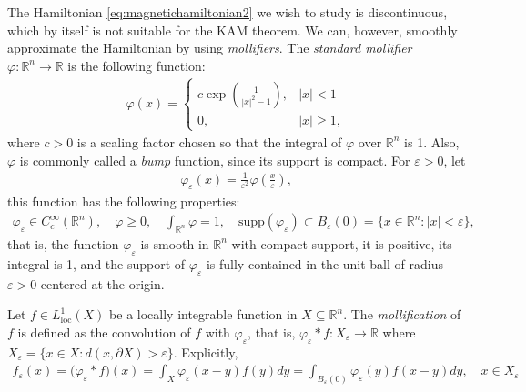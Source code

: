 The Hamiltonian \eqref{eq:magnetichamiltonian2} we wish to study is discontinuous, which by itself is not suitable for the KAM theorem. We can, however, smoothly approximate the Hamiltonian by using \textit{mollifiers}. The \textit{standard mollifier} $\varphi:\mathbb R^n\to\mathbb R$ is the following function:
\begin{align*}
\varphi(x) = \left\{\begin{array}{ll}
c\exp\left(\frac{1}{|x|^2-1}\right), & |x| <1\\
0, & |x|\ge 1,
\end{array}
\right.
\end{align*}
where $c>0$ is a scaling factor chosen so that the integral of $\varphi$ over $\mathbb R^n$ is 1. Also, $\varphi$ is commonly called a \textit{bump} function, since its support is compact. For $\varepsilon>0$, let
\begin{align*}
\varphi_\varepsilon(x) = \frac{1}{\varepsilon^2}\varphi\left(\frac{x}{\varepsilon}\right),
\end{align*} 
this function has the following properties:
\begin{align*}
\varphi_\varepsilon\in C_c^\infty(\mathbb R^n),\quad
\varphi\ge 0,\quad
\int_{\mathbb R^n}\varphi =1,\quad
\text{supp}(\varphi_\varepsilon)\subset B_\varepsilon(0)=\{x\in\mathbb R^n:|x|<\varepsilon\},
\end{align*}
that is, the function $\varphi_\varepsilon$ is smooth in $\mathbb R^n$ with compact support, it is positive, its integral is 1, and the support of $\varphi_\varepsilon$ is fully contained in the unit ball of radius $\varepsilon>0$ centered at the origin.
  
Let $f\in L_{\text{loc}}^1(X)$ be a locally integrable function in $X \subseteq\mathbb R^n$. The \textit{mollification} of $f$ is defined as the convolution of $f$ with $\varphi_\varepsilon$, that is, $\varphi_\varepsilon*f:X_\varepsilon\to\mathbb R$ where $X_\varepsilon=\{x\in X: d(x,\partial X)>\varepsilon\}$. Explicitly,
\begin{align*}
f_\varepsilon(x) = \big(\varphi_\varepsilon * f\big)(x) = \int_X\varphi_\varepsilon(x-y)f(y)dy = \int_{B_\varepsilon(0)}\varphi_\varepsilon(y)f(x-y)dy,\quad x\in X_\varepsilon
\end{align*}


